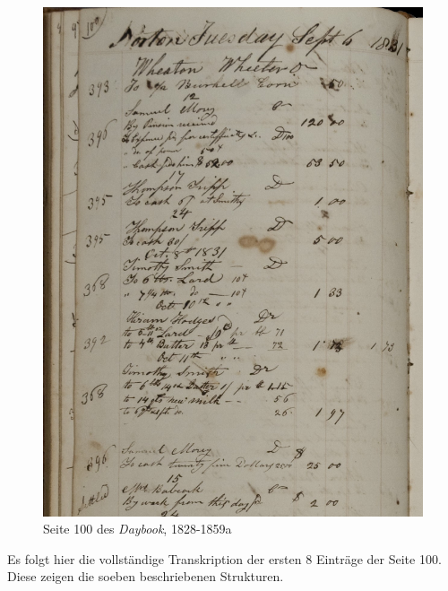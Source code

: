 \documentclass[12pt,a4paper]{article}
\begin{document}
\begin{figure}[H]
\centering
	\includegraphics[width=1\textwidth]{img/wheaton_100_101.jpg}  
    \caption[Seite 100 des \textit{Daybook, \protect\url{hdl.handle.net/11040/17982}}, 1828-1859]{Seite 100 des \textit{Daybook}, 1828-1859a} \label{fig:wheaton}
\end{figure}
Es folgt hier die vollständige Transkription der ersten 8 Einträge der Seite 100. Diese zeigen die soeben beschriebenen Strukturen.
\\
\\
\end{document}
